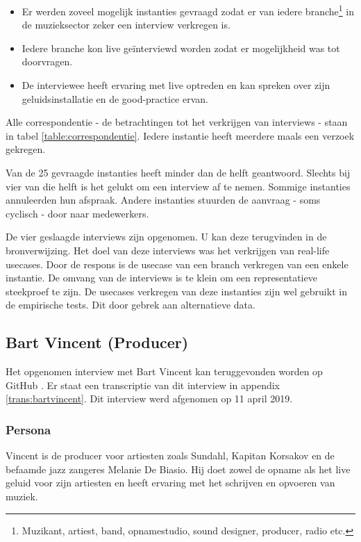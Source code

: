 \begin{itemize}
    \item Er werden zoveel mogelijk instanties gevraagd zodat er van iedere branche\footnote{Muzikant, artiest, band, opnamestudio, sound designer, producer, radio etc.} in de muzieksector zeker een interview verkregen is.
    \item Iedere branche kon live geïnterviewd worden zodat er mogelijkheid was tot doorvragen.
    \item De interviewee heeft ervaring met live optreden en kan spreken over zijn geluidsinstallatie en de good-practice ervan.
\end{itemize}{}

Alle correspondentie - de betrachtingen tot het verkrijgen van interviews - staan in tabel \ref{table:correspondentie}. Iedere instantie heeft meerdere maals een verzoek gekregen. 

Van de 25 gevraagde instanties heeft minder dan de helft geantwoord. Slechts bij vier van die helft is het gelukt om een interview af te nemen. Sommige instanties annuleerden hun afspraak. Andere instanties stuurden de aanvraag - soms cyclisch - door naar medewerkers.

De vier geslaagde interviews zijn opgenomen. U kan deze terugvinden in de bronverwijzing. Het doel van deze interviews was het verkrijgen van real-life usecases. Door de respons is de usecase van een branch verkregen van een enkele instantie. De omvang van de interviews is te klein om een representatieve steekproef te zijn. De usecases verkregen van deze instanties zijn wel gebruikt in de empirische tests. Dit door gebrek aan alternatieve data.

\subsection{Bart Vincent (Producer)}

Het opgenomen interview met Bart Vincent kan teruggevonden worden op GitHub \autocite{bartvincent}. Er staat een transcriptie van dit interview in appendix \ref{trans:bartvincent}. Dit interview werd afgenomen op 11 april 2019.

\subsubsection*{Persona}

Vincent is de producer voor artiesten zoals Sundahl, Kapitan Korsakov en de befaamde jazz zangeres Melanie De Biasio. Hij doet zowel de opname als het live geluid voor zijn artiesten en heeft ervaring met het schrijven en opvoeren van muziek.

